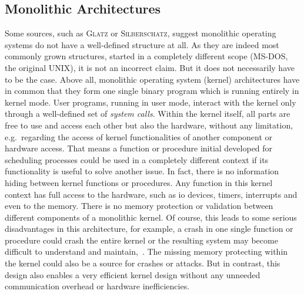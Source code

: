 \subsection{Monolithic Architectures}\label{sec:monolithic-archs}
Some sources, such as \textsc{Glatz}\cite{glatz2015betriebssysteme} or \textsc{Silberschatz}\cite{silberschatz2009operating}, suggest monolithic operating systems do not have a well-defined structure at all. 
As they are indeed most commonly grown structures, started in a completely different scope (MS-DOS, the original UNIX), it is not an incorrect claim.
But it does not necessarily have to be the case.
Above all, monolithic operating system (kernel) architectures have in common that they form one single binary program which is running entirely in kernel mode.
User programs, running in user mode, interact with the kernel only through a well-defined set of \textit{system calls}\cite{lfd430}. 
Within the kernel itself, all parts are free to use and access each other but also the hardware, without any limitation, e.g.\ regarding the access of kernel functionalities of another component or hardware access. 
That means a function or procedure initial developed for scheduling processes could be used in a completely different context if its functionality is useful to solve another issue.
In fact, there is no information hiding between kernel functions or procedures.
Any function in this kernel context has full access to the hardware, such as \ac{io} devices, timers, interrupts and even to the memory. 
There is no memory protection or validation between different components of a monolithic kernel. 
Of course, this leads to some serious disadvantages in this architecture, for example, a crash in one single function or procedure could crash the entire kernel or the resulting system may become difficult to understand and maintain\cite{tanenbaum-modern-operating-systems},~\cite{silberschatz2009operating}.
The missing memory protecting within the kernel could also be a source for crashes or attacks.
But in contrast, this design also enables a very efficient kernel design without any unneeded communication overhead or hardware inefficiencies\cite{lfd430}.

